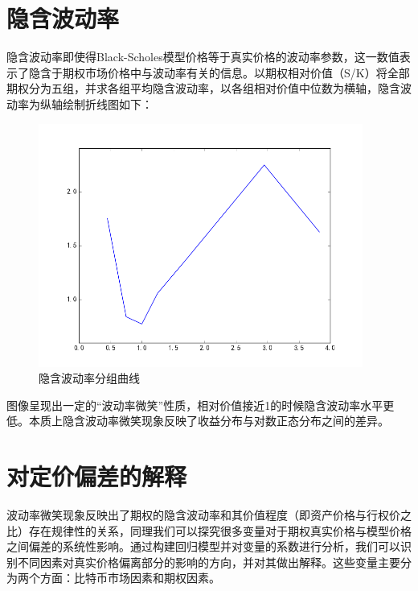 {\section{隐含波动率}
隐含波动率即使得Black-Scholes模型价格等于真实价格的波动率参数，这一数值表示了隐含于期权市场价格中与波动率有关的信息。以期权相对价值（S/K）将全部期权分为五组，并求各组平均隐含波动率，以各组相对价值中位数为横轴，隐含波动率为纵轴绘制折线图如下：
\begin{figure}[H]
\begin{small}
\begin{center}
\includegraphics[width=0.95\textwidth]{figures/mean_isd.png}
\end{center}
\caption{隐含波动率分组曲线}
\label{fig:mean_isd}
\end{small}
\end{figure}
图像呈现出一定的“波动率微笑”性质，相对价值接近1的时候隐含波动率水平更低。本质上隐含波动率微笑现象反映了收益分布与对数正态分布之间的差异。

\section{对定价偏差的解释}\label{reg vars}
波动率微笑现象反映出了期权的隐含波动率和其价值程度（即资产价格与行权价之比）存在规律性的关系，同理我们可以探究很多变量对于期权真实价格与模型价格之间偏差的系统性影响。通过构建回归模型并对变量的系数进行分析，我们可以识别不同因素对真实价格偏离部分的影响的方向，并对其做出解释。这些变量主要分为两个方面：比特币市场因素和期权因素。
}
